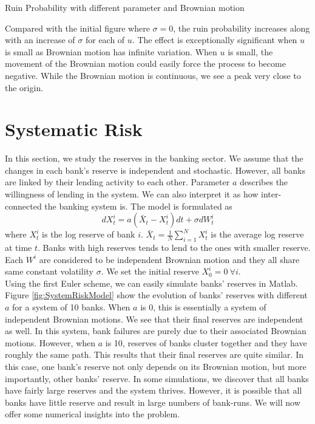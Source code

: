 \documentclass[a4paper,11pt]{article}
\begin{document}
\begin{table}[htb]
	\centering
	
	\quad
	
	\quad
	
	\caption{Ruin Probability with different parameter and Brownian motion}
	\label{tab:ruin_vs_all_with_BM}
\end{table}
Compared with the initial figure where $\sigma=0$, the ruin probability increases along with an increase of $\sigma$ for each of $u$. The effect is exceptionally significant when $u$ is small as Brownian motion has infinite variation. When $u$ is small, the movement of the Brownian motion could easily force the process to become negative. While the Brownian motion is continuous, we see a peak very close to the origin. 

\section{Systematic Risk}
In this section, we study the reserves in the banking sector. We assume that the changes in each bank's reserve is independent and stochastic. However, all banks are linked by their lending activity to each other. Parameter $a$ describes the willingness of lending in the system. We can also interpret it as how inter-connected the banking system is. The model is formulated as 
\begin{equation}
	dX^i_t = a(\bar{X}_t-X^i_t)dt + \sigma dW_t^i
	\label{eq:SystemRiskModel}
\end{equation}
where $X_t^i$ is the log reserve of bank $i$. $\bar{X}_t = \frac{1}{N}\sum^N_{i=1}X^i_t$ is the average log reserve at time $t$. Banks with high reserves tends to lend to the ones with smaller reserve. Each $W^i$ are considered to be independent Brownian motion and they all share same constant volatility $\sigma$. We set the initial reserve $X_0^i = 0 \ \forall i$.\\

Using the first Euler scheme, we can easily simulate banks' reserves in Matlab. Figure \ref{fig:SystemRiskModel} show the evolution of banks' reserves with different $a$ for a system of 10 banks. When $a$ is 0, this is essentially a system of independent Brownian motions. We see that their final reserves are independent as well. In this system, bank failures are purely due to their associated Brownian motions. However, when $a$ is 10, reserves of banks cluster together and they have roughly the same path. This results that their final reserves are quite similar. In this case, one bank's reserve not only depends on its Brownian motion, but more importantly, other banks' reserve. In some simulations, we discover that all banks have fairly large reserves and the system thrives. However, it is possible that all banks have little reserve and result in large numbers of bank-runs. We will now offer some numerical insights into the problem.\\
\end{document}
